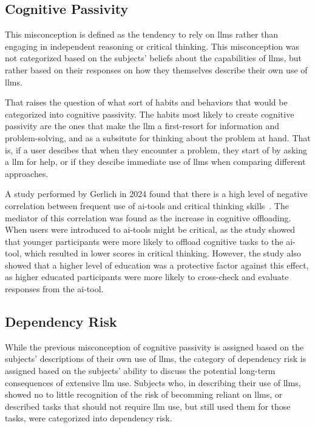 \subsection{Cognitive Passivity}\label{cogpass}
This misconception is defined as the tendency to rely on \gls{llms} rather than engaging in independent reasoning or critical thinking. This misconception was not categorized based on the subjects' beliefs about the capabilities of \gls{llms}, but rather based on their responses on how they themselves describe their own use of \gls{llms}. 

That raises the question of what sort of habits and behaviors that would be categorized into cognitive passivity. The habits most likely to create cognitive passivity are the ones that make the \gls{llm} a first-resort for information and problem-solving, and as a subsitute for thinking about the problem at hand. That is, if a user descibes that when they encounter a problem, they start of by asking a \gls{llm} for help, or if they descibe immediate use of \gls{llms} when comparing different approaches.

A study performed by Gerlich in 2024 found that there is a high level of negative correlation between frequent use of \gls{ai}-tools and critical thinking skills\ \cite{gerlich_ai_2025}. The mediator of this correlation was found as the increase in cognitive offloading. When users were introduced to \gls{ai}-tools might be critical, as the study showed that younger participants were more likely to offload cognitive tasks to the \gls{ai}-tool, which resulted in lower scores in critical thinking. However, the study also showed that a higher level of education was a protective factor against this effect, as higher educated participants were more likely to cross-check and evaluate responses from the \gls{ai}-tool.

\subsection{Dependency Risk}\label{deprisk}
While the previous misconception of cognitive passivity is assigned based on the subjects' descriptions of their own use of \gls{llms}, the category of dependency risk is assigned based on the subjects' ability to discuss the potential long-term consequences of extensive \gls{llm} use. Subjects who, in describing their use of \gls{llms}, showed no to little recognition of the risk of becomming reliant on \gls{llms}, or described tasks that should not require \gls{llm} use, but still used them for those tasks, were categorized into dependency risk.


